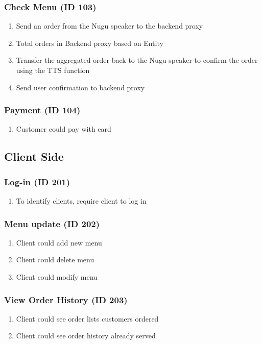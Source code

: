 \documentclass[conference,compsoc]{IEEEtran}
\begin{document}
\subsubsection{Check Menu (ID 103)}
\begin{enumerate}
  \item Send an order from the Nugu speaker to the backend proxy
  \item Total orders in Backend proxy based on Entity
  \item Transfer the aggregated order back to the Nugu speaker to confirm the order using the TTS function
  \item Send user confirmation to backend proxy
\end{enumerate}

\subsubsection{Payment (ID 104)}
\begin{enumerate}
  \item Customer could pay with card  
\end{enumerate}

\subsection{Client Side}

\subsubsection{Log-in (ID 201)}
\begin{enumerate}
  \item To identify clients, require client to log in  
\end{enumerate}

\subsubsection{Menu update (ID 202)}
\begin{enumerate}
  \item Client could add new menu
  \item Client could delete menu
  \item Client could modify menu  
\end{enumerate}

\subsubsection{View Order History (ID 203)}
\begin{enumerate}
  \item Client could see order lists customers ordered
  \item Client could see order history already served
\end{enumerate}
\end{document}
